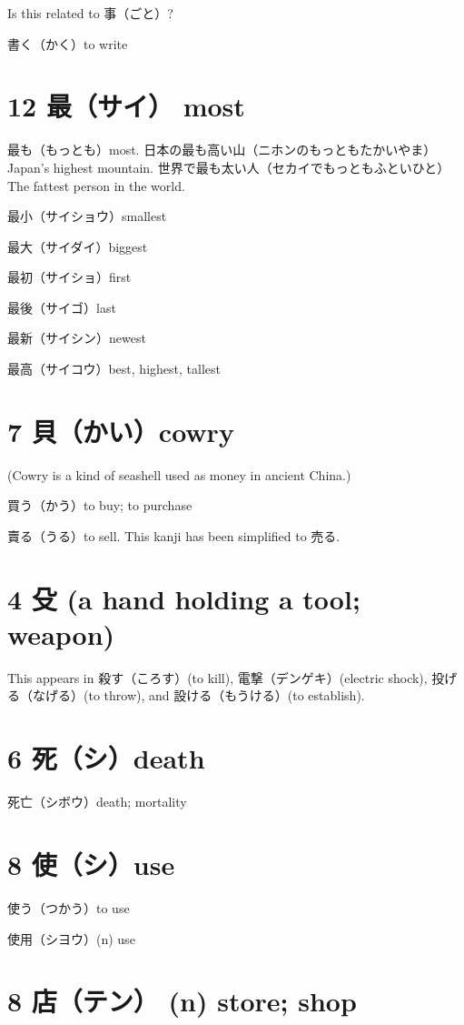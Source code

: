 Is this related to 事（ごと）?

書く（かく）to write

\section{12 最（サイ） most}

最も（もっとも）most.
日本の最も高い山（ニホンのもっともたかいやま）Japan's highest mountain.
世界で最も太い人（セカイでもっともふといひと）The fattest person in the world.

最小（サイショウ）smallest

最大（サイダイ）biggest

最初（サイショ）first

最後（サイゴ）last

最新（サイシン）newest

最高（サイコウ）best, highest, tallest

\section{7 貝（かい）cowry}

(Cowry is a kind of seashell used as money in ancient China.)

買う（かう）to buy; to purchase

賣る（うる）to sell.
This kanji has been simplified to 売る.

\section{4 殳 (a hand holding a tool; weapon)}

This appears in
殺す（ころす）(to kill),
電撃（デンゲキ）(electric shock),
投げる（なげる）(to throw),
and 設ける（もうける）(to establish).

\section{6 死（シ）death}

死亡（シボウ）death; mortality

\section{8 使（シ）use}

使う（つかう）to use

使用（シヨウ）(n) use

\section{8 店（テン） (n) store; shop}


